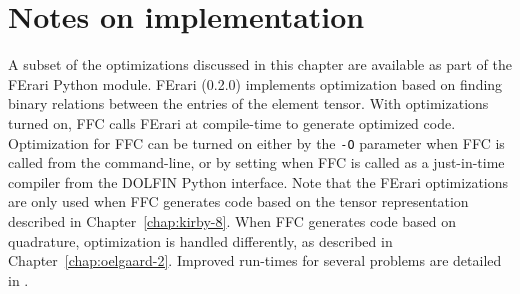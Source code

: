 \section{Notes on implementation}

A subset of the optimizations discussed in this chapter are available
as part of the FErari Python module. FErari
(0.2.0) implements optimization based on finding binary relations
between the entries of the element tensor. With optimizations turned
on, FFC calls FErari at compile-time to generate optimized
code. Optimization for FFC can be turned on either by the \texttt{-O}
parameter when FFC is called from the command-line, or by setting
 when FFC is
called as a just-in-time compiler from the DOLFIN Python
interface. Note that the FErari optimizations are only used when FFC
generates code based on the tensor representation described in
Chapter~\ref{chap:kirby-8}. When FFC generates code based on
quadrature, optimization is handled differently, as described in
Chapter~\ref{chap:oelgaard-2}. Improved run-times for several
problems are detailed in \citet{KirbyLogg2008}.
